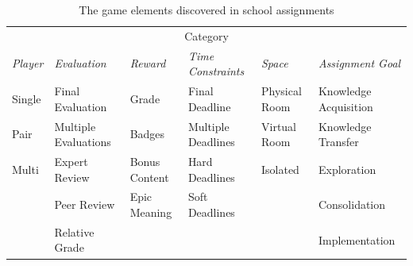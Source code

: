 \documentclass[11pt]{article}
\newcommand{\ra}[1]{\renewcommand{\arraystretch}{#1}}
\begin{document}
\begin{table}[h!t]\centering
\ra{1.3}
\footnotesize
\begin{tabular}{@{}*{6}{ l }@{}}
\toprule
\multicolumn{6}{c}{Category}  \\
\emph{Player} & \emph{Evaluation} & \emph{Reward} & \emph{Time Constraints} & \emph{Space} & \emph{Assignment Goal} \\
 \cmidrule(r){1-1} \cmidrule(r){2-2} \cmidrule(r){3-3} \cmidrule(r){4-4} \cmidrule(r){5-5} \cmidrule(r){6-6}
Single & Final Evaluation & Grade & Final Deadline & Physical Room & Knowledge Acquisition \\
Pair & Multiple Evaluations & Badges 	& Multiple Deadlines & Virtual Room & Knowledge Transfer \\
Multi & Expert Review 		& Bonus Content & Hard Deadlines & Isolated & Exploration \\
      & Peer Review 		& Epic Meaning	& Soft Deadlines & & Consolidation \\
      & Relative Grade 		&		& & &Implementation \\
\bottomrule
\end{tabular}
\caption{The game elements discovered in school assignments\label{tab:game_elements_assignments}}
\end{table}
\end{document}
